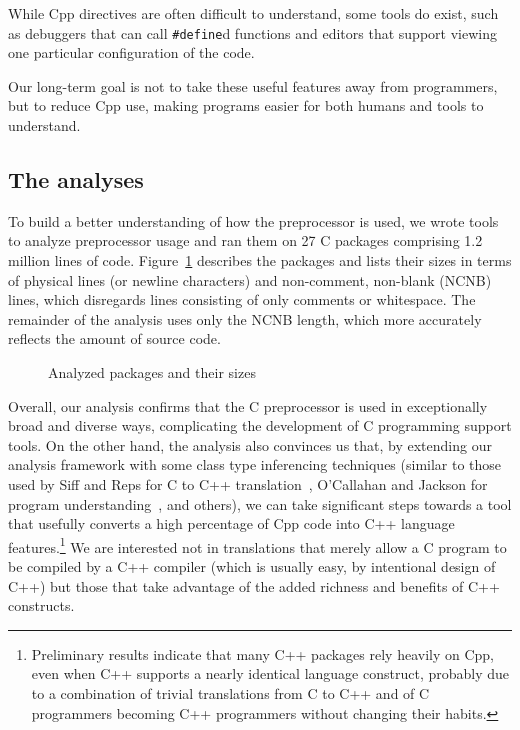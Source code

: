 \documentclass[11pt]{article}
\def\numpackages{27}
\def\numlines{1.2 million}
\begin{document}

While Cpp directives are often difficult to understand, some tools do
exist, such as debuggers that can call {\tt \#define}d functions and
editors that support viewing one particular configuration of the code.

Our long-term goal is not to take these useful features away from
programmers, but to reduce Cpp use, making programs easier for both humans
and tools to understand.


\subsection{The analyses}

To build a better understanding of how the preprocessor is used,
we wrote tools to analyze preprocessor usage and ran them on {\numpackages}
C packages comprising {\numlines} lines of code.  Figure~\ref{fig:packages}
describes the packages and lists their sizes in terms of physical lines (or
newline characters) and non-comment, non-blank (NCNB) lines, which
disregards lines consisting of only comments or whitespace.  The remainder
of the analysis uses only the NCNB length, which more accurately reflects
the amount of source code.

\begin{figure}
\centering
{\small
  \setlength{\tabcolsep}{.25em}
  
}
\caption{Analyzed packages and their sizes}
\label{fig:packages}
\end{figure}


Overall, our analysis confirms that the C preprocessor is used in
exceptionally broad and diverse ways, complicating the development of C
programming support tools.  On the other hand, the analysis also convinces
us that, by extending our analysis framework with some class type
inferencing techniques (similar to those used by Siff and Reps for C to C++
translation~\cite{Siff-fse96}, O'Callahan and Jackson for program
understanding~\cite{OCallahan-icse97}, and others), we can take significant
steps towards a tool that usefully converts a high percentage of Cpp code
into C++ language features.\footnote{Preliminary results indicate that many
  C++ packages rely heavily on Cpp, even when C++ supports a nearly
  identical language construct, probably due to a combination of trivial
  translations from C to C++ and of C programmers becoming C++ programmers
  without changing their habits.} We are interested not in translations
that merely allow a C program to be compiled by a C++ compiler (which is
usually easy, by intentional design of C++) but those that take advantage
of the added richness and benefits of C++ constructs.
\end{document}
